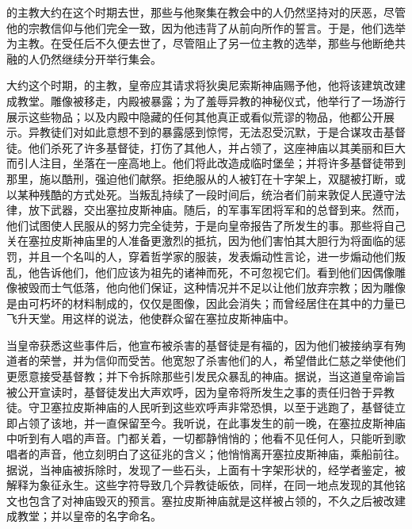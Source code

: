 的主教大约在这个时期去世，那些与他聚集在教会中的人仍然坚持对的厌恶，尽管他的宗教信仰与他们完全一致，因为他违背了从前向所作的誓言。于是，他们选举为主教。在受任后不久便去世了，尽管阻止了另一位主教的选举，那些与他断绝共融的人仍然继续分开举行集会。\par

大约这个时期，的主教，皇帝应其请求将狄奥尼索斯神庙赐予他，他将该建筑改建成教堂。雕像被移走，内殿被暴露；为了羞辱异教的神秘仪式，他举行了一场游行展示这些物品；以及内殿中隐藏的任何其他真正或看似荒谬的物品，他都公开展示。异教徒们对如此意想不到的暴露感到惊愕，无法忍受沉默，于是合谋攻击基督徒。他们杀死了许多基督徒，打伤了其他人，并占领了，这座神庙以其美丽和巨大而引人注目，坐落在一座高地上。他们将此改造成临时堡垒；并将许多基督徒带到那里，施以酷刑，强迫他们献祭。拒绝服从的人被钉在十字架上，双腿被打断，或以某种残酷的方式处死。当叛乱持续了一段时间后，统治者们前来敦促人民遵守法律，放下武器，交出塞拉皮斯神庙。随后，的军事军团将军和的总督到来。然而，他们试图使人民服从的努力完全徒劳，于是向皇帝报告了所发生的事。那些将自己关在塞拉皮斯神庙里的人准备更激烈的抵抗，因为他们害怕其大胆行为将面临的惩罚，并且一个名叫的人，穿着哲学家的服装，发表煽动性言论，进一步煽动他们叛乱，他告诉他们，他们应该为祖先的诸神而死，不可忽视它们。看到他们因偶像雕像被毁而士气低落，他向他们保证，这种情况并不足以让他们放弃宗教；因为雕像是由可朽坏的材料制成的，仅仅是图像，因此会消失；而曾经居住在其中的力量已飞升天堂。用这样的说法，他使群众留在塞拉皮斯神庙中。\par

当皇帝获悉这些事件后，他宣布被杀害的基督徒是有福的，因为他们被接纳享有殉道者的荣誉，并为信仰而受苦。他宽恕了杀害他们的人，希望借此仁慈之举使他们更愿意接受基督教；并下令拆除那些引发民众暴乱的神庙。据说，当这道皇帝谕旨被公开宣读时，基督徒发出大声欢呼，因为皇帝将所发生之事的责任归咎于异教徒。守卫塞拉皮斯神庙的人民听到这些欢呼声非常恐惧，以至于逃跑了，基督徒立即占领了该地，并一直保留至今。我听说，在此事发生的前一晚，在塞拉皮斯神庙中听到有人唱的声音。门都关着，一切都静悄悄的；他看不见任何人，只能听到歌唱者的声音，他立刻明白了这征兆的含义；他悄悄离开塞拉皮斯神庙，乘船前往。据说，当神庙被拆除时，发现了一些石头，上面有十字架形状的，经学者鉴定，被解释为象征永生。这些字符导致几个异教徒皈依，同样，在同一地点发现的其他铭文也包含了对神庙毁灭的预言。塞拉皮斯神庙就是这样被占领的，不久之后被改建成教堂；并以皇帝的名字命名。\par

